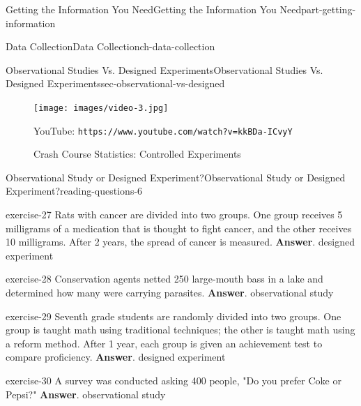 \documentclass[oneside,10pt,]{book}
\newcommand{\mono}[1]{\texttt{#1}}
\numberwithin{equation}{section}
\newlength{\qrsize}
\newlength{\previewwidth}
\begin{document}
\begin{partptx}{Getting the Information You Need}{}{Getting the Information You Need}{}{}{part-getting-information}
\begin{chapterptx}{Data Collection}{}{Data Collection}{}{}{ch-data-collection}
\begin{sectionptx}{Observational Studies Vs. Designed Experiments}{}{Observational Studies Vs. Designed Experiments}{}{}{sec-observational-vs-designed}
\begin{figure}
\begin{tcbraster}[raster columns=2, raster column skip=1pt, raster halign=center, raster force size=false, raster left skip=0pt, raster right skip=0pt]
\begin{tcolorbox}[previewstyle, width=\previewwidth]
\texttt{[image: images/video-3.jpg]}%
\end{tcolorbox}%
\begin{tcolorbox}[qrstyle]%
{\hypersetup{urlcolor=black}}%
\end{tcolorbox}%
\begin{tcolorbox}[captionstyle]%
\small YouTube: \mono{https://www.youtube.com/watch?v=kkBDa-ICvyY}\end{tcolorbox}%
\end{tcbraster}%
\caption{Crash Course Statistics: Controlled Experiments\label{figure-3}}
\end{figure}
%
%
\typeout{************************************************}
\typeout{************************************************}
%
\begin{reading-questions-subsection-numberless}{Observational Study or Designed Experiment?}{}{Observational Study or Designed Experiment?}{}{}{reading-questions-6}
\begin{divisionexercise}{1}{}{}{exercise-27}%
Rats with cancer are divided into two groups. One group receives 5 milligrams of a medication that is thought to fight cancer, and the other receives 10 milligrams. After 2 years, the spread of cancer is measured. \textbf{Answer}.\hypertarget{answer-27}{}\quad%
designed experiment\end{divisionexercise}%
\begin{divisionexercise}{2}{}{}{exercise-28}%
Conservation agents netted 250 large-mouth bass in a lake and determined how many were carrying parasites. \textbf{Answer}.\hypertarget{answer-28}{}\quad%
observational study\end{divisionexercise}%
\begin{divisionexercise}{3}{}{}{exercise-29}%
Seventh grade students are randomly divided into two groups. One group is taught math using traditional techniques; the other is taught math using a reform method. After 1 year, each group is given an achievement test to compare proficiency. \textbf{Answer}.\hypertarget{answer-29}{}\quad%
designed experiment\end{divisionexercise}%
\begin{divisionexercise}{4}{}{}{exercise-30}%
A survey was conducted asking 400 people, "Do you prefer Coke or Pepsi?" \textbf{Answer}.\hypertarget{answer-30}{}\quad%
observational study\end{divisionexercise}%

\end{reading-questions-subsection-numberless}
\end{sectionptx}
\end{chapterptx}
\end{partptx}
\end{document}
